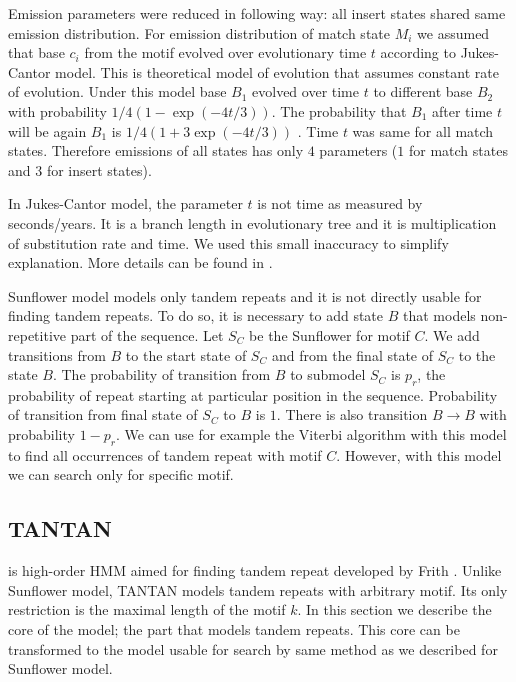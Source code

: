 Emission parameters were reduced in following way: all insert states shared
same emission distribution. For emission distribution of match state $M_i$ we
assumed that base $c_i$ from the motif evolved over evolutionary time $t$
according to Jukes-Cantor model. This is theoretical model of evolution
that assumes constant rate of evolution. Under this model base $B_1$ evolved
over time $t$ to different base $B_2$  with probability $1/4(1-\exp(-4t/3))$.
The probability that $B_1$ after time $t$ will be again $B_1$ is
$1/4(1+3\exp(-4t/3))$ \cite{Durbin1998}. Time $t$ was same for all match
states. Therefore emissions of all states has only $4$ parameters ($1$ for
match states and $3$ for insert states).

\begin{note}
In Jukes-Cantor model, the parameter $t$ is not time as measured by
seconds/years. It is a branch length in evolutionary tree and it is
multiplication of substitution rate and time. We used this small inaccuracy to
simplify explanation.  More details can be found in \cite{Durbin1998}.
\end{note}

Sunflower model models only tandem repeats and it is not directly usable for
finding tandem repeats. To do so, it is necessary to add state $B$ that models
non-repetitive part of the sequence. Let $S_C$ be the Sunflower for motif  $C$.
We add transitions from $B$ to the start state of $S_C$ and from the final
state of $S_C$ to the state $B$. The probability of transition from $B$ to
submodel $S_C$ is $p_r$, the probability of repeat starting at particular
position in the sequence. Probability of transition from final state of $S_C$
to $B$ is $1$.  There is also transition $B\to B$ with probability $1-p_r$. We
can use for example the Viterbi algorithm with this model to find all
occurrences of tandem repeat with motif $C$. However, with this model we can
search only for specific motif. 

\subsection{TANTAN}\label{SECTION:TANTAN}

 is high-order HMM aimed for finding tandem repeat developed
by Frith \cite{Frith2011}. Unlike Sunflower model, TANTAN models tandem repeats
with arbitrary motif. Its only restriction is the maximal length of the motif
$k$. In this section we describe the core of the model; the part that models
tandem repeats. This core can be transformed to the model usable for search by
same method as we described for Sunflower model.

